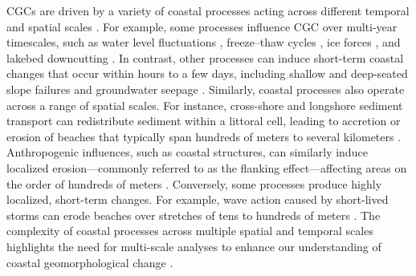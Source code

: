 CGCs are driven by a variety of coastal processes acting across different
temporal and spatial scales \citep{lollino2021multi}. For example, some
processes influence CGC over multi-year timescales, such as water level
fluctuations
\citep{meadows_relationship_1997,brown_factors_2005,swenson_bluff_2006},
freeze–thaw cycles
\citep{vallejo1981stability,bernatchez2011development,roland2021seasonality},
ice forces \citep{barnes1994influence,bamasoud2012impact,volpano2025modeling},
and lakebed downcutting \citep{davidson2000effects,fuller2002bank}. In contrast,
other processes can induce short-term coastal changes that occur within hours to
a few days, including shallow and deep-seated slope failures
\citep{edil_mechanics_1980,quinn2010identifying} and groundwater seepage
\citep{collins_processes_2008,brooks2012deriving}. Similarly, coastal processes
also operate across a range of spatial scales. For instance, cross-shore and
longshore sediment transport can redistribute sediment within a littoral cell,
leading to accretion or erosion of beaches that typically span hundreds of
meters to several kilometers \citep{harley2011reevaluation}. Anthropogenic
influences, such as coastal structures, can similarly induce localized
erosion—commonly referred to as the flanking effect—affecting areas on the order
of hundreds of meters
\citep{lin_field_2014,kraus1996effects,mattheus_climate-induced_2014}.
Conversely, some processes produce highly localized, short-term changes. For
example, wave action caused by short-lived storms can erode beaches over
stretches of tens to hundreds of meters
\citep{ruggiero_wave_2001,swenson_bluff_2006}. The complexity of coastal
processes across multiple spatial and temporal scales highlights the need for
multi-scale analyses to enhance our understanding of coastal geomorphological
change \citep{ells2012long}.


